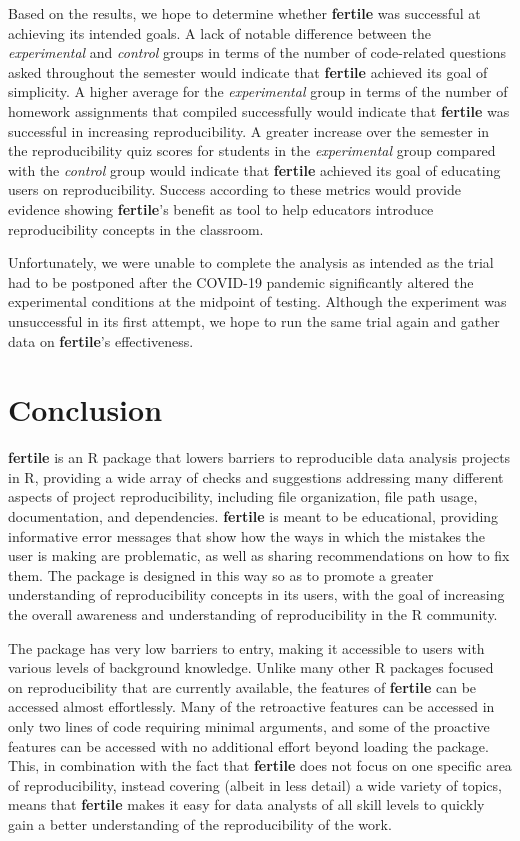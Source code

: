 \documentclass[APA,LATO1COL]{WileyNJD-v2}\usepackage[]{graphicx}\usepackage[]{color}
\newcommand{\R}{\textsf{R}\xspace}
\newcommand{\pkg}[1]{\textbf{#1}}
\begin{document}
Based on the results, we hope to determine whether \pkg{fertile} was successful at achieving its intended goals. A lack of notable difference between the \emph{experimental} and \emph{control} groups in terms of the number of code-related questions asked throughout the semester would indicate that \pkg{fertile} achieved its goal of simplicity. A higher average for the \emph{experimental} group in terms of the number of homework assignments that compiled successfully would indicate that \pkg{fertile} was successful in increasing reproducibility. A greater increase over the semester in the reproducibility quiz scores for students in the \emph{experimental} group compared with the \emph{control} group would indicate that \pkg{fertile} achieved its goal of educating users on reproducibility. Success according to these metrics would provide evidence showing \pkg{fertile}'s benefit as tool to help educators introduce reproducibility concepts in the classroom.

Unfortunately, we were unable to complete the analysis as intended as the trial had to be postponed after the COVID-19 pandemic significantly altered the experimental conditions at the midpoint of testing. Although the experiment was unsuccessful in its first attempt, we hope to run the same trial again and gather data on \pkg{fertile}'s effectiveness. 



\section{Conclusion}\label{sec:conclusion}


\pkg{fertile} is an \R package that lowers barriers to reproducible data analysis projects in \R, providing a wide array of checks and suggestions addressing many different aspects of project reproducibility, including file organization, file path usage, documentation, and dependencies.
\pkg{fertile} is meant to be educational, providing informative error messages that show how the ways in which the mistakes the user is making are problematic, as well as sharing recommendations on how to fix them. The package is designed in this way so as to promote a greater understanding of reproducibility concepts in its users, with the goal of increasing the overall awareness and understanding of reproducibility in the \R community.

The package has very low barriers to entry, making it accessible to users with various levels of background knowledge. Unlike many other \R packages focused on reproducibility that are currently available, the features of \pkg{fertile} can be accessed almost effortlessly. Many of the retroactive features can be accessed in only two lines of code requiring minimal arguments, and some of the proactive features can be accessed with no additional effort beyond loading the package. This, in combination with the fact that \pkg{fertile} does not focus on one specific area of reproducibility, instead covering (albeit in less detail) a wide variety of topics, means that \pkg{fertile} makes it easy for data analysts of all skill levels to quickly gain a better understanding of the reproducibility of the work.
\end{document}
